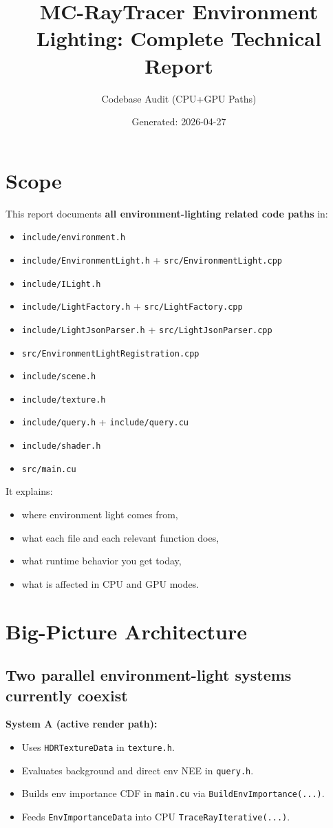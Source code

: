 \documentclass[11pt]{article}
\title{MC-RayTracer Environment Lighting: Complete Technical Report}
\author{Codebase Audit (CPU+GPU Paths)}
\date{Generated: 2026-04-27}
\begin{document}
\maketitle
\tableofcontents
\newpage

\section{Scope}
This report documents \textbf{all environment-lighting related code paths} in:
\begin{itemize}[leftmargin=1.5em]
  \item \verb|include/environment.h|
  \item \verb|include/EnvironmentLight.h| + \verb|src/EnvironmentLight.cpp|
  \item \verb|include/ILight.h|
  \item \verb|include/LightFactory.h| + \verb|src/LightFactory.cpp|
  \item \verb|include/LightJsonParser.h| + \verb|src/LightJsonParser.cpp|
  \item \verb|src/EnvironmentLightRegistration.cpp|
  \item \verb|include/scene.h|
  \item \verb|include/texture.h|
  \item \verb|include/query.h| + \verb|include/query.cu|
  \item \verb|include/shader.h|
  \item \verb|src/main.cu|
\end{itemize}

It explains:
\begin{itemize}[leftmargin=1.5em]
  \item where environment light comes from,
  \item what each file and each relevant function does,
  \item what runtime behavior you get today,
  \item what is affected in CPU and GPU modes.
\end{itemize}

\section{Big-Picture Architecture}
\subsection{Two parallel environment-light systems currently coexist}
\textbf{System A (active render path):}
\begin{itemize}[leftmargin=1.5em]
  \item Uses \verb|HDRTextureData| in \verb|texture.h|.
  \item Evaluates background and direct env NEE in \verb|query.h|.
  \item Builds env importance CDF in \verb|main.cu| via \verb|BuildEnvImportance(...)|.
  \item Feeds \verb|EnvImportanceData| into CPU \verb|TraceRayIterative(...)|.
\end{itemize}
\end{document}
